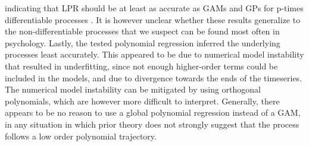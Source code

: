 indicating that LPR should be at least as accurate as GAMs and GPs for
p-times differentiable processes \parencite{fan_local_1997}. It is however
unclear whether these results generalize to the non-differentiable processes
that we suspect can be found most often in psychology. Lastly, the tested
polynomial regression inferred the underlying processes least accurately. This appeared
to be due to numerical model instability that resulted in underfitting, since
not enough higher-order terms could be included in the models, and due to
divergence towards the ends of the timeseries. The numerical model instability
can be mitigated by using orthogonal polynomials, which are however more
difficult to interpret. Generally, there appears to be no reason to use
a global polynomial regression instead of a GAM, in any situation in which
prior theory does not strongly suggest that the process follows a low order
polynomial trajectory.
